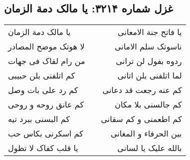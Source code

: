 \begin{center}
\section*{غزل شماره ۳۲۱۴: یا مالک دمة الزمان}
\label{sec:3214}
\begin{longtable}{l p{0.5cm} r}
یا مالک دمة الزمان
&&
یا فاتح جنة الامعانی
\\
لا هوتک موضح المصادر
&&
ناسوتک سلم الامانی
\\
من رام لقاک فی جهات
&&
ردوه بفول لن ترانی
\\
کم اتلفنی بلن حبیبی
&&
لما اتلفنی بلن اتانی
\\
کم رد علی بات وصل
&&
کم عنه رجعت قد دعانی
\\
کم عانق روحه و روحی
&&
کم جالسنی بلا مکان
\\
کم البسنی ببرد تیه
&&
کم اطعمنی و کم سقانی
\\
کم اسکرنی بکاس حب
&&
بین الحرفاء و المغانی
\\
یا قلب کفاک لا تطول
&&
بالله علیک یا لسانی
\\
\end{longtable}
\end{center}
